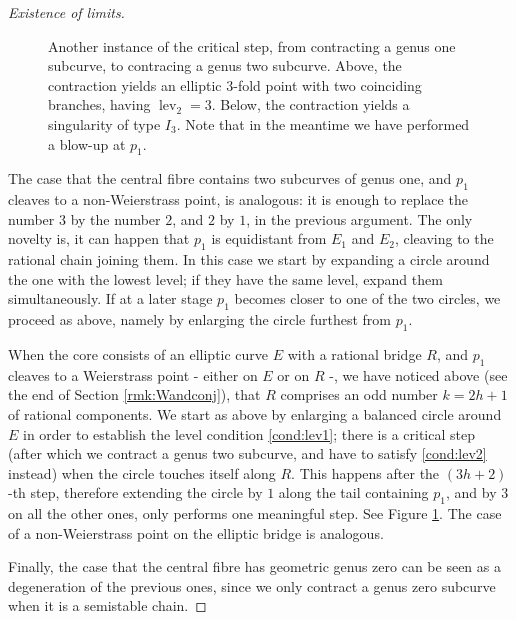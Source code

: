 \documentclass{compositio}
\newcommand{\lev}{\operatorname{lev}}
\theoremstyle{plain}
\theoremstyle{definition}
\theoremstyle{remark}
\begin{document}
\begin{proof}[Existence of limits]
\begin{figure}[h!bt]
\begin{minipage}[b]{0.45\textwidth}
        \caption{Another instance of the critical step, from contracting a genus one subcurve, to contracing a genus two subcurve. Above, the contraction yields an elliptic $3$-fold point with two coinciding branches, having $\lev_2=3$. Below, the contraction yields a singularity of type $I_3$. Note that in the meantime we  have performed a blow-up at $p_1$.}\label{fig:crit_step_ER}
    \end{minipage}
\end{figure}
 
 The case that the central fibre contains two subcurves of genus one, and $p_1$ cleaves to a non-Weierstrass point, is analogous: it is enough to replace the number $3$ by the number $2$, and $2$ by $1$, in the previous argument. The only novelty is, it can happen that $p_1$ is equidistant from $E_1$ and $E_2$, cleaving to the rational chain joining them. In this case we start by expanding a circle around the one with the lowest level; if they have the same level, expand them simultaneously. If at a later stage $p_1$ becomes closer to one of the two circles, we proceed as above, namely by enlarging the circle furthest from $p_1$.
 
 \smallskip
 
 When the core consists of an elliptic curve $E$ with a rational bridge $R$, and $p_1$ cleaves to a Weierstrass point - either on $E$ or on $R$ -, we have noticed above (see the end of Section \ref{rmk:Wandconj}), that $R$ comprises an odd number $k=2h+1$ of rational components. We start as above by enlarging a balanced circle around $E$ in order to establish the level condition \eqref{cond:lev1};  there is a critical step (after which we contract a genus two subcurve, and have to satisfy \eqref{cond:lev2} instead) when the circle touches itself along $R$. This happens after the $(3h+2)$-th step, therefore extending the circle by $1$ along the tail containing $p_1$, and by $3$ on all the other ones, only performs one meaningful step. See Figure \ref{fig:crit_step_ER}. The case of a non-Weierstrass point on the elliptic bridge is analogous.
 
  
 \smallskip
 
 Finally, the case that the central fibre has geometric genus zero can be seen as a degeneration of the previous ones, since we only contract a genus zero subcurve when it is a semistable chain.
 \end{proof}
 
\end{document}
